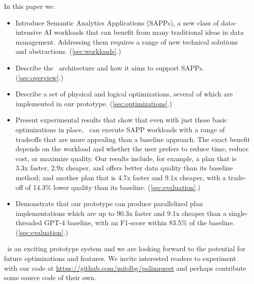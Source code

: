  In this paper we:
\begin{itemize}
    \item Introduce Semantic Analytics Applications (SAPPs), a new class of data-intensive AI workloads that can benefit from many traditional ideas in data management. Addressing them requires a range of new technical solutions and abstractions. (\autoref{sec:workloads}.)
    \item Describe the \system\ architecture and how it aims to support SAPPs. (\autoref{sec:overview}.)
    \item Describe a set of physical and logical optimizations, several of which are implemented in our prototype. (\autoref{sec:optimizations}.)
    \item Present experimental results that show that even with just these basic optimizations in place, \system\ can execute SAPP workloads with a range of tradeoffs that are more appealing than a baseline approach.  The exact benefit depends on the workload and whether the user prefers to reduce time, reduce cost, or maximize quality. Our results include, for example, a plan that is 3.3x faster, 2.9x cheaper, and offers better data quality than its baseline method; and another plan that is 4.7x faster and 9.1x cheaper, with a trade-off of 14.3\% lower quality than its baseline. (\autoref{sec:evaluation}.)
    \item Demonstrate that our prototype can produce parallelized plan implementations which are up to 90.3x faster and 9.1x cheaper than a single-threaded GPT-4 baseline, with an F1-score within 83.5\% of the baseline. (\autoref{sec:evaluation}.)
\end{itemize}


\system\ is an exciting prototype system and we are looking forward to the potential for future optimizations and features. We invite interested readers to experiment with our code at \url{https://github.com/mitdbg/palimpzest} and perhaps contribute some source code of their own.
